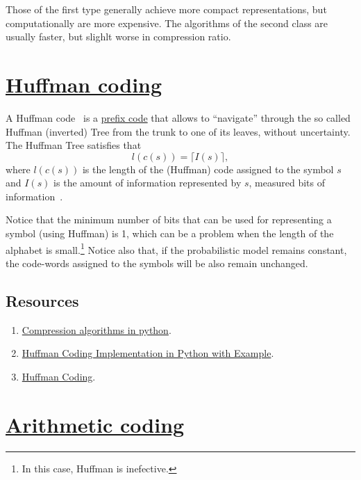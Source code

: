 Those of the first type generally achieve more compact
representations, but computationally are more expensive. The
algorithms of the second class are usually faster, but slighlt worse
in compression ratio.

\section{\href{https://en.wikipedia.org/wiki/Huffman_coding}{Huffman coding}}

A Huffman code~\cite{vruiz__huffman_coding} is a
\href{https://en.wikipedia.org/wiki/Prefix_code}{prefix code} that
allows to ``navigate'' through the so called Huffman (inverted) Tree
from the trunk to one of its leaves, without
uncertainty. The Huffman Tree satisfies that
\begin{equation}
  l(c(s)) = \lceil I(s)\rceil,
  \label{eq:huffman_performance}
\end{equation}
where $l(c(s))$ is the length of the (Huffman) code assigned to the
symbol $s$ and $I(s)$ is the amount of information represented by $s$,
measured bits of information~\cite{vruiz__information_theory}.

Notice that the minimum number of bits that can be used for
representing a symbol (using Huffman) is 1, which can be a problem
when the length of the alphabet is small.\footnote{In this case,
  Huffman is inefective.} Notice also that, if the probabilistic model
remains constant, the code-words assigned to the symbols will be also
remain unchanged.

\subsection*{Resources}
\begin{enumerate}
\item \href{https://www.inference.org.uk/mackay/python/compress/#Huff}{Compression algorithms in python}.
\item \href{https://favtutor.com/blogs/huffman-coding}{Huffman Coding Implementation in Python with Example}.
\item \href{https://www.programiz.com/dsa/huffman-coding}{Huffman Coding}.
\end{enumerate}

\section{\href{https://en.wikipedia.org/wiki/Arithmetic_coding}{Arithmetic
    coding}~\cite{vruiz__arithmetic_coding}}

